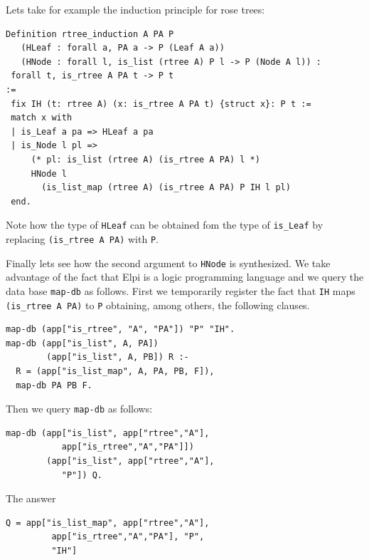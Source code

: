 \documentclass[sigplan,10pt,review]{acmart}\settopmatter{printfolios=true,printccs=false,printacmref=false}
\begin{document}
Lets take for example the induction principle for rose trees:

\begin{minipage}{\textwidth}\begin{lstlisting}
Definition rtree_induction A PA P  
   (HLeaf : forall a, PA a -> P (Leaf A a))
   (HNode : forall l, is_list (rtree A) P l -> P (Node A l)) :
 forall t, is_rtree A PA t -> P t
:=
 fix IH (t: rtree A) (x: is_rtree A PA t) {struct x}: P t :=
 match x with
 | is_Leaf a pa => HLeaf a pa
 | is_Node l pl =>
     (* pl: is_list (rtree A) (is_rtree A PA) l *)
     HNode l
       (is_list_map (rtree A) (is_rtree A PA) P IH l pl)
 end.
\end{lstlisting}\end{minipage}

Note how the type of \lstinline+HLeaf+ can be obtained fom the
type of \lstinline+is_Leaf+ by replacing \lstinline+(is_rtree A PA)+
with \lstinline+P+.

Finally lets see  how the second argument to \lstinline+HNode+ is
synthesized.  We take advantage of the fact that Elpi is a logic
programming language and we query the data base \lstinline+map-db+
as follows. First we temporarily register 
the fact that \lstinline+IH+ maps
\lstinline+(is_rtree A PA)+ to \lstinline+P+ obtaining, among others,
the following clauses.

\begin{minipage}{\textwidth}\begin{lstlisting}[]
map-db (app["is_rtree", "A", "PA"]) "P" "IH".
map-db (app["is_list", A, PA])
        (app["is_list", A, PB]) R :-
  R = (app["is_list_map", A, PA, PB, F]),
  map-db PA PB F.
\end{lstlisting}\end{minipage}

Then we query \lstinline+map-db+ as follows:

\begin{minipage}{\textwidth}\begin{lstlisting}[]
map-db (app["is_list", app["rtree","A"],
           app["is_rtree","A","PA"]])
        (app["is_list", app["rtree","A"],
           "P"]) Q.
\end{lstlisting}\end{minipage}

\noindent
The answer

\begin{minipage}{\textwidth}\begin{lstlisting}[]
Q = app["is_list_map", app["rtree","A"],
         app["is_rtree","A","PA"], "P",
         "IH"]
\end{lstlisting}\end{minipage}
\end{document}
